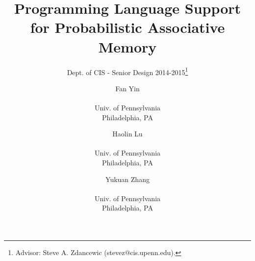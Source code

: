 \documentclass{sig-alternate}
\begin{document}
 

\title{Programming Language Support for Probabilistic Associative Memory}
\subtitle{Dept. of CIS - Senior Design 2014-2015\thanks{Advisor: Steve A. Zdancewic (stevez@cis.upenn.edu).}}
\author{
    Fan Yin \\  \\Univ. of Pennsylvania \\ Philadelphia, PA
    \and Haolin Lu \\  \\Univ. of Pennsylvania \\ Philadelphia, PA
    \and Yukuan Zhang\\  \\Univ. of Pennsylvania \\ Philadelphia, PA
}
%
%
\date{}
\maketitle
\end{document}

